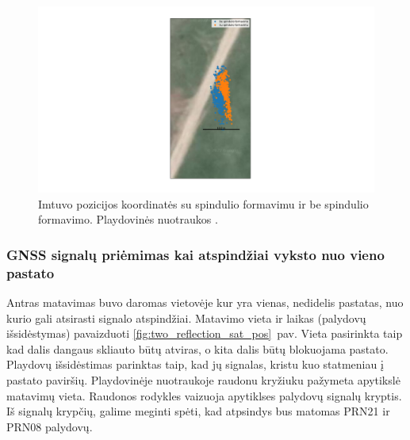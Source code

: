 \documentclass[main.tex]{subfiles}
\begin{document}
\begin{figure}[ht]
    \begin{centering}
    \hspace*{-3cm}\includegraphics[scale=0.45]{drawings/no_reflection_map}
    \par\end{centering}
    \protect\caption{\label{fig:no_reflection_map}Imtuvo pozicijos koordinatės su spindulio formavimu ir be spindulio formavimo. Playdovinės nuotraukos \cite{google_maps}.}
\end{figure}



\subsubsection{GNSS signalų priėmimas kai atspindžiai vyksto nuo vieno pastato}

Antras matavimas buvo daromas vietovėje kur yra vienas, nedidelis pastatas, nuo kurio gali atsirasti
signalo atspindžiai. Matavimo vieta ir laikas (palydovų išsidėstymas) pavaizduoti \ref{fig:two_reflection_sat_pos}~pav.
Vieta pasirinkta taip kad dalis dangaus skliauto būtų atviras, o kita dalis būtų blokuojama pastato.
Playdovų išsidėstimas parinktas taip, kad jų signalas, kristu kuo statmeniau į pastato paviršių.
Playdovinėje nuotraukoje raudonu kryžiuku pažymeta apytikslė matavimų vieta. Raudonos rodykles
vaizuoja apytiklses palydovų signalų kryptis. Iš signalų krypčių, galime meginti spėti,
kad atpsindys bus matomas PRN21 ir PRN08 palydovų.
\end{document}
